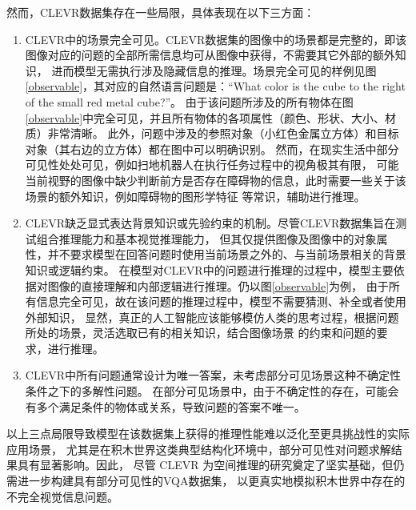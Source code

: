 然而，CLEVR数据集存在一些局限，具体表现在以下三方面：
\begin{enumerate}[itemsep=0pt,parsep=0pt]
\item CLEVR中的场景完全可见。CLEVR数据集的图像中的场景都是完整的，即该图像对应的问题的全部所需信息均可从图像中获得，不需要其它外部的额外知识，
进而模型无需执行涉及隐藏信息的推理。场景完全可见的样例见图\ref{observable}，其对应的自然语言问题是：“What color is the cube to the right of the small red metal cube?”。
由于该问题所涉及的所有物体在图\ref{observable}中完全可见，并且所有物体的各项属性（颜色、形状、大小、材质）非常清晰。
此外，问题中涉及的参照对象（小红色金属立方体）和目标对象（其右边的立方体）都在图中可以明确识别。
然而，在现实生活中部分可见性处处可见，例如扫地机器人在执行任务过程中的视角极其有限，
可能当前视野的图像中缺少判断前方是否存在障碍物的信息，此时需要一些关于该场景的额外知识，例如障碍物的图形学特征
等常识，辅助进行推理。
\item CLEVR缺乏显式表达背景知识或先验约束的机制。尽管CLEVR数据集旨在测试组合推理能力和基本视觉推理能力，
但其仅提供图像及图像中的对象属性，并不要求模型在回答问题时使用当前场景之外的、与当前场景相关的背景知识或逻辑约束。
在模型对CLEVR中的问题进行推理的过程中，模型主要依据对图像的直接理解和内部逻辑进行推理。仍以图\ref{observable}为例，
由于所有信息完全可见，故在该问题的推理过程中，模型不需要猜测、补全或者使用外部知识，
显然，真正的人工智能应该能够模仿人类的思考过程，根据问题所处的场景，灵活选取已有的相关知识，结合图像场景
的约束和问题的要求，进行推理。
\item CLEVR中所有问题通常设计为唯一答案，未考虑部分可见场景这种不确定性条件之下的多解性问题。
在部分可见场景中，由于不确定性的存在，可能会有多个满足条件的物体或关系，导致问题的答案不唯一。
\end{enumerate}
以上三点局限导致模型在该数据集上获得的推理性能难以泛化至更具挑战性的实际应用场景，
尤其是在积木世界这类典型结构化环境中，部分可见性对问题求解结果具有显著影响。因此，
尽管 CLEVR 为空间推理的研究奠定了坚实基础，但仍需进一步构建具有部分可见性的VQA数据集，
以更真实地模拟积木世界中存在的不完全视觉信息问题。
